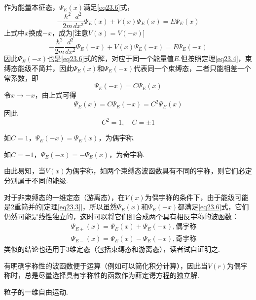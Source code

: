 \prove 作为能量本征态，$\varPsi_{E}(x)$满足\eqref{eq23.6}式，
\begin{equation*}
	-\frac{\hbar^{2}}{2m}\frac{d^{2}}{dx^{2}}\varPsi_{E}(x)+V(x)\varPsi_{E}(x)=E\varPsi_{E}(x)
\end{equation*}
上式中$x$换成$-x$，成为[注意$V(x)=V(-x)$]
\begin{equation*}
	-\frac{\hbar^{2}}{2m}\frac{d^{2}}{dx^{2}}\varPsi_{E}(-x)+V(x)\varPsi_{E}(-x)=E\varPsi_{E}(-x)
\end{equation*}\eqshort
因此$\varPsi_{E}(-x)$也是\eqref{eq23.6}式的解，对应于同一个能量值$E$.但按照定理\eqref{eq23.4}，束缚态能级不简并，因此$\varPsi_{E}(x)$和$\varPsi_{E}(-x)$代表同一个束缚态，二者只能相差一个常系数，即
\begin{equation*}
	\varPsi_{E}(-x)=C\varPsi_{E}(x)
\end{equation*}\eqnormal
令$x\rightarrow-x$，由上式可得
\begin{equation*}
	\varPsi_{E}(x)=C\varPsi_{E}(-x)=C^{2}\varPsi_{E}(x)
\end{equation*}\eqshort
因此
\begin{equation*}
	C^{2}=1,\quad C= \pm 1
\end{equation*}\eqnormal

如$C=1$，$\varPsi_{E}(-x)=\varPsi_{E}(x)$，为偶宇称.

如$C=-1$，$\varPsi_{E}(-x)=-\varPsi_{E}(x)$，为奇宇称

由此易知，当$V(x)$为偶宇称，如两个束缚态波函数具有不同的宇称，则它们必定分别属于不同的能级.

对于非束缚态的一维定态（游离态），在$V(x)$为偶宇称的条件下，由于能级可能是2重简并的[定理\eqref{eq23.3}]，所以虽然$\varPsi_{E}(x)$和$\varPsi_{E}(-x)$都满足\eqref{eq23.6}式，它们仍然可能是线性独立的，这时可以将它们组合成两个具有相反宇称的波函数：
\eqlong
\begin{equation} \label{eq23.12}
	\begin{aligned} 
		&& \varPsi_{E+}(x)=\varPsi_{E}(x)+\varPsi_{E}(-x), \text{偶宇称}	\\
		&& \varPsi_{E-}(x)=\varPsi_{E}(x)-\varPsi_{E}(-x), \text{奇宇称}
	\end{aligned}
\end{equation}\eqshort
类似的结论也适用于3维定态（包括束缚态和游离态），读者试自证明之.

有明确宇称性的波函数便于运算（例如可以简化积分计算），因此当$V(r)$为偶宇称时，总是尽量选择具有宇称性的函数作为薛定谔方程的独立解.

\example 粒子的一维自由运动.

